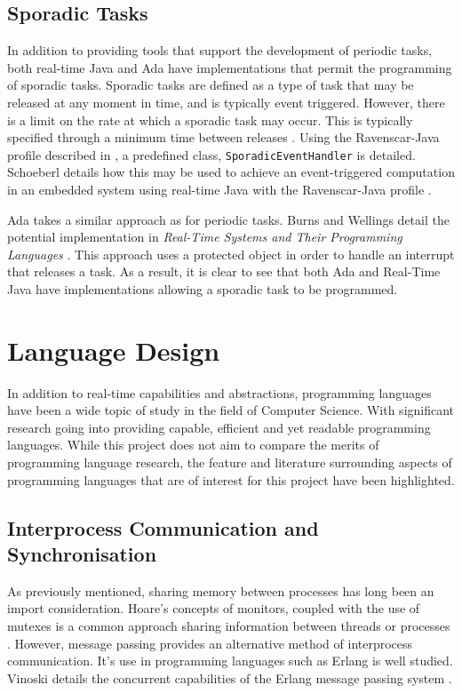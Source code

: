 \subsection{Sporadic Tasks}
In addition to providing tools that support the development of periodic tasks, 
both real-time Java and Ada have implementations that permit the 
programming of sporadic tasks. 
Sporadic tasks are defined as a type of task that may be released at any moment in 
time, and is typically event triggered. However, there is a limit on the rate at 
which a sporadic task may occur. This is typically specified through a minimum 
time between releases \cite{11111101}. 
Using the Ravenscar-Java profile described in \cite{ravenscar-java}, a predefined 
class, \texttt{SporadicEventHandler} is detailed. Schoeberl details how this may 
be used to achieve an event-triggered computation in an embedded system using 
real-time Java with the Ravenscar-Java profile \cite{1300334}. 
\par\bigskip\noindent
Ada takes a similar approach as for periodic tasks. Burns and Wellings detail the 
potential implementation in \emph{Real-Time Systems and Their Programming Languages}
\cite[p341]{real-time-systems}. 
This approach uses a protected object in order to handle an interrupt that releases a 
task.
As a result, it is clear to see that both Ada and Real-Time Java have implementations 
allowing a sporadic task to be programmed. 

\section{Language Design}
In addition to real-time capabilities and abstractions, programming languages have 
been a wide topic of study in the field of Computer Science. With significant 
research going into providing capable, efficient and yet readable programming 
languages. While this project does not aim to compare the merits of programming 
language research, the feature and literature surrounding aspects of programming 
languages that are of interest for this project have been highlighted. 

\subsection{Interprocess Communication and Synchronisation} %
As previously mentioned, sharing memory between processes has long been an import 
consideration. Hoare's concepts of monitors, coupled with the use of mutexes is a 
common approach sharing information between threads or processes 
\cite{Hoare:1974:MOS:355620,361161}. 
However, message passing provides an alternative method of interprocess communication. 
It's use in programming languages such as Erlang is well studied. Vinoski 
details the concurrent capabilities of the Erlang message passing system 
\cite{6216341}.




